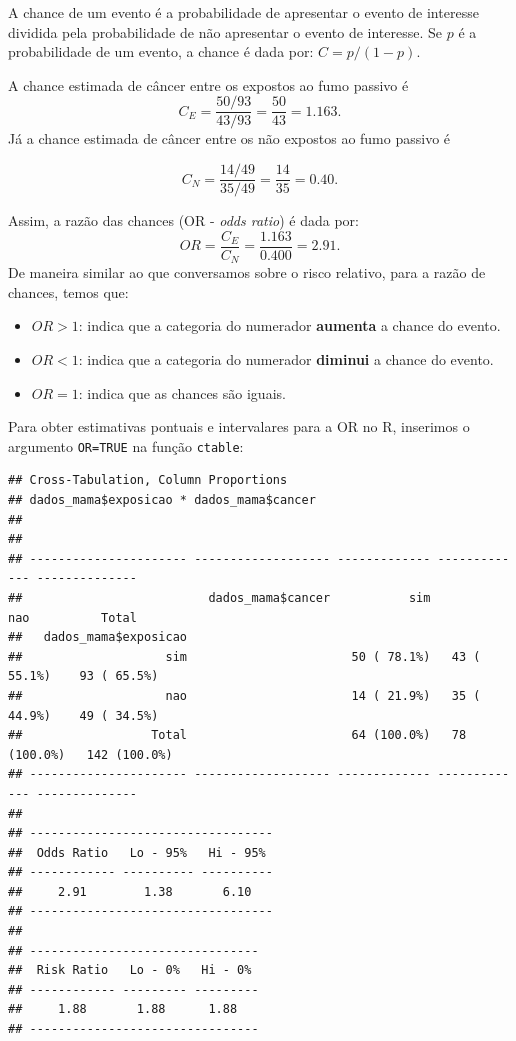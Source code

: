 \documentclass[
]{book}
\newenvironment{Shaded}{\begin{snugshade}}{\end{snugshade}}
\newcommand{\DataTypeTok}[1]{\textcolor[rgb]{0.13,0.29,0.53}{#1}}
\newcommand{\KeywordTok}[1]{\textcolor[rgb]{0.13,0.29,0.53}{\textbf{#1}}}
\newcommand{\NormalTok}[1]{#1}
\newcommand{\OperatorTok}[1]{\textcolor[rgb]{0.81,0.36,0.00}{\textbf{#1}}}
\newcommand{\OtherTok}[1]{\textcolor[rgb]{0.56,0.35,0.01}{#1}}
\newcommand{\StringTok}[1]{\textcolor[rgb]{0.31,0.60,0.02}{#1}}
\begin{document}
A chance de um evento é a probabilidade de apresentar o evento de interesse dividida pela probabilidade de não apresentar o evento de interesse. Se \(p\) é a probabilidade de um evento, a chance é dada por: \(C=p/(1-p)\).

A chance estimada de câncer entre os expostos ao fumo passivo é
\[
C_E=\frac{50/93}{43/93}=\frac{50}{43}=1.163.
\]
Já a chance estimada de câncer entre os não expostos ao fumo passivo é

\[
C_N=\frac{14/49}{35/49}=\frac{14}{35}=0.40.
\]

Assim, a razão das chances (OR - \emph{odds ratio}) é dada por:
\[
OR=\frac{C_E}{C_N}=\frac{1.163}{0.400}=2.91.
\]
De maneira similar ao que conversamos sobre o risco relativo, para a razão de chances, temos que:

\begin{itemize}
\item
  \(OR>1\): indica que a categoria do numerador \textbf{aumenta} a chance do evento.
\item
  \(OR<1\): indica que a categoria do numerador \textbf{diminui} a chance do evento.
\item
  \(OR=1\): indica que as chances são iguais.
\end{itemize}

Para obter estimativas pontuais e intervalares para a OR no R, inserimos o argumento \texttt{OR=TRUE} na função \texttt{ctable}:

\begin{Shaded}
\end{Shaded}

\begin{verbatim}
## Cross-Tabulation, Column Proportions  
## dados_mama$exposicao * dados_mama$cancer  
## 
## 
## ---------------------- ------------------- ------------- ------------- --------------
##                          dados_mama$cancer           sim           nao          Total
##   dados_mama$exposicao                                                               
##                    sim                       50 ( 78.1%)   43 ( 55.1%)    93 ( 65.5%)
##                    nao                       14 ( 21.9%)   35 ( 44.9%)    49 ( 34.5%)
##                  Total                       64 (100.0%)   78 (100.0%)   142 (100.0%)
## ---------------------- ------------------- ------------- ------------- --------------
## 
## ----------------------------------
##  Odds Ratio   Lo - 95%   Hi - 95% 
## ------------ ---------- ----------
##     2.91        1.38       6.10   
## ----------------------------------
## 
## --------------------------------
##  Risk Ratio   Lo - 0%   Hi - 0% 
## ------------ --------- ---------
##     1.88       1.88      1.88   
## --------------------------------
\end{verbatim}
\end{document}
